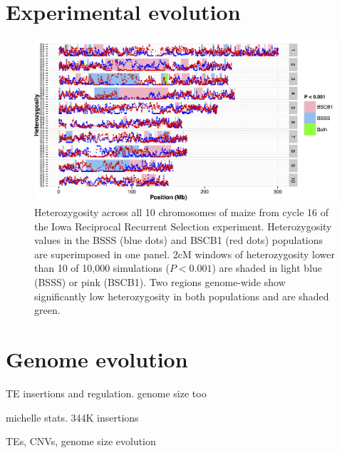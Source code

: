 \documentclass[11pt]{article}
\begin{document}

\section*{Experimental evolution}

\begin{figure}[tb]   
  \begin{center}
\includegraphics[width=0.8\linewidth]{figs/gerke.png}
   \caption{Heterozygosity across all 10 chromosomes of maize from cycle 16 of the Iowa Reciprocal Recurrent Selection experiment. Heterozygosity values in the BSSS  (blue dots) and BSCB1 (red dots) populations are superimposed in one panel. 2cM windows of heterozygosity lower than 10 of 10,000 simulations ($P<0.001$) are shaded in light blue (BSSS) or pink (BSCB1). Two regions genome-wide show significantly low heterozygosity in both populations and are shaded green.} 
    \label{fig:heterotic}
  \end{center}
\end{figure}

\section*{Genome evolution}

TE insertions \citep{studer2011identification, makarevitch2015transposable} and regulation. 
genome size too \citep{tenaillon2011genome}

michelle stats. 344K insertions

TEs, CNVs, genome size evolution
\end{document}
